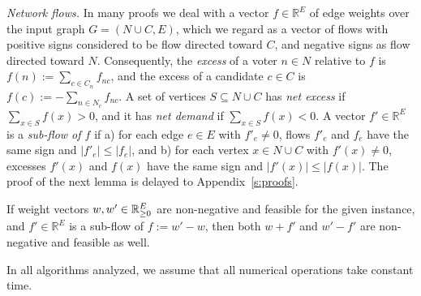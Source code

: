 \emph{Network flows.}
In many proofs we deal with a vector $f\in\mathbb{R}^{E}$ of edge weights over the input graph $G=(N\cup C,E)$, which we regard as a vector of flows with positive signs considered to be flow directed toward $C$, and negative signs as flow directed toward $N$. 
Consequently, the \emph{excess} of a voter $n\in N$ relative to $f$ is $f(n):=\sum_{c\in C_n} f_{nc}$, and the excess of a candidate $c\in C$ is $f(c):= -\sum_{n\in N_c} f_{nc}$. 
A set of vertices $S\subseteq N\cup C$ has \emph{net excess} if $\sum_{x\in S} f(x)>0$, and it has \emph{net demand} if $\sum_{x\in S} f(x)<0$.    
A vector $f'\in\mathbb{R}^E$ is a \emph{sub-flow of $f$} if a) for each edge $e\in E$ with $f'_e\neq 0$, flows $f'_e$ and $f_e$ have the same sign and $|f'_e|\leq |f_e|$, and b) for each vertex $x\in N\cup C$ with $f'(x)\neq 0$, excesses $f'(x)$ and $f(x)$ have the same sign and $|f'(x)|\leq |f(x)|$. 
The proof of the next lemma is delayed to Appendix~\ref{s:proofs}.

\begin{lemma}\label{lem:subflow}
If weight vectors $w, w'\in\mathbb{R}_{\geq 0}^E$ are non-negative and feasible for the given instance, and $f'\in\mathbb{R}^E$ is a sub-flow of $f:=w'-w$, then both $w+f'$ and $w'-f'$ are non-negative and feasible as well.
\end{lemma}

\begin{remark}
In all algorithms analyzed, we assume that all numerical operations take constant time.
\end{remark}
